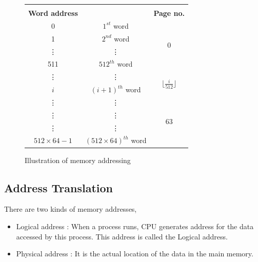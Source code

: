 \documentclass[11pt]{article}
\begin{document}
\begin{figure}[htp!] \small
	\centering
	\begin{tabular}{c|c|c|} 
		\multicolumn{3}{c}{} \\
		\textbf{Word address} &  & \textbf{Page no.} \\ \cline{2-3}
		0 & $1^{st}$ word & \multirow{4}{*}{$0$} \\ \cline{2-2}
		1 & $2^{nd}$ word &  \\ \cline{2-2}
		\vdots & \vdots & \\ \cline{2-2}
		511 & $512^{th}$ word &  \\ \cline{2-3}

		\vdots & \vdots & \multirow{2}{*}{$\lfloor \frac{i}{512} \rfloor $} \\ \cline{2-2}
		$i$ & $(i+1)^{th} $ word &  \\ \cline{2-2}
		\vdots &\vdots &  \\ \cline{2-3}

		\vdots & \vdots & \multirow{2}{*}{$63$} \\ \cline{2-2}
		\vdots &\vdots &  \\ \cline{2-2}
		$512 \times 64 - 1$ & $(512 \times 64)^{th} $ word &  \\ \cline{2-3}
	\end{tabular}
	\caption{Illustration of memory addressing}
	\label{fig:mem_struct}
\end{figure}


\subsection{Address Translation}

There are two kinds of memory addresses,\\

\begin{itemize}
\item Logical address : When a process runs, CPU generates address for the data accessed by this process. This address is called the Logical address.

\item Physical address : It is the actual location of the data in the main memory.
\end{itemize}
\end{document}
